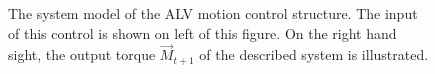 \begin{figure}[H]
\begin{center}
\begin{tikzpicture}
\end{tikzpicture}
\caption{The system model of the ALV motion control structure. The input of this control is shown on left of this figure. On the right hand sight, the output torque $\vec{M}_{t+1}$ of the described system is illustrated.}
\label{fig: consenspers}
\end{center}
\end{figure}